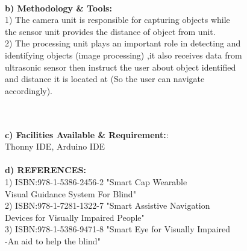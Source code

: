 \documentclass[12pt]{article}
\begin{document}
\begin{tabbing}
		\\
		
		
		\hspace{1in} \textbf{b) Methodology \& Tools:}\> \\ \hspace{5.4cm} 1) The camera unit is responsible for capturing objects while
		\\ \hspace{5.6cm}the sensor unit provides the distance of object from unit.
		\\ \hspace{5.4cm} 2) The processing unit plays an important role in detecting and\\ \hspace{5.4cm} identifying objects (image processing) ,it also receives data from\\ \hspace{5.4cm} ultrasonic sensor then instruct the user about object identified\\ \hspace{5.4cm} and distance it is located at (So the user can navigate\\ \hspace{5.4cm} accordingly).
		
		\\
		
		\\
		
		
		\hspace{1in} \textbf{c) Facilities Available \& Requirement:}\>: \\ \hspace{5.4cm} Thonny IDE, Arduino IDE \\
		
		
		
		\\
		\hspace{1in} \textbf{d) REFERENCES:}\>
		\\ \hspace{5.4cm}1) ISBN:978-1-5386-2456-2 "Smart Cap  Wearable\\ \hspace{5.6cm} Visual Guidance System For Blind"
		\\ \hspace{5.4cm}2) ISBN:978-1-7281-1322-7 "Smart Assistive Navigation\\ \hspace{5.6cm} Devices for Visually Impaired People"
		\\ \hspace{5.4cm}3) ISBN:978-1-5386-9471-8 "Smart Eye for Visually Impaired\\ \hspace{5.6cm} -An aid to help the blind"
		\\
		

\end{tabbing}
\end{document}
